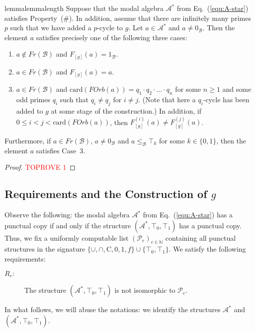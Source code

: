 \documentclass[a4paper,UKenglish,cleveref, autoref, thm-restate]{lipics-v2021}
\begin{document}
\begin{restatable}{lemma}{lemmalength}\label{lemma:length}
	Suppose that the modal algebra $\mathcal{A}^{\ast}$ from Eq.~(\ref{equ:A-star}) satisfies Property~(\#). In addition, assume that there are infinitely many primes $p$ such that we have added a $p$-cycle to $g$. Let $a \in \mathcal{A}^{\ast}$ and $a \neq 0_{\mathcal{B}}$. Then the element $a$ satisfies precisely one of the following three cases:
	\begin{enumerate}
		\item $a\not\in Fr(\mathcal{B})$ and $F_{[g]}(a) = 1_{\mathcal{B}}$.
		
		\item $a \in Fr(\mathcal{B})$ and $F_{[g]}(a) = a$.
		
		\item $a\in Fr(\mathcal{B})$ and $\mathrm{card}(FOrb(a)) = q_1\cdot q_2\cdot \ldots\cdot  q_n$ for some $n\geq 1$ and some odd primes $q_i$ such that $q_i \neq q_j$ for $i\neq j$. (Note that here a $q_i$-cycle has been added to $g$ at some stage of the construction.) In addition, if $0\leq i < j < \mathrm{card}(FOrb(a))$, then $F_{[g]}^{(i)}(a) \neq F_{[g]}^{(j)}(a)$. 
	\end{enumerate}
	Furthermore, if $a\in Fr(\mathcal{B})$, $a\neq 0_{\mathcal{B}}$ and $a \leq_{\mathcal{B}} \top_k$ for some $k\in\{ 0,1\}$, then the element $a$ satisfies Case~3.
\end{restatable}
\begin{proof}\textcolor{red}{TOPROVE 1}\end{proof}


\subsection{Requirements and the Construction of $g$}

Observe the following: the modal algebra $\mathcal{A}^{\ast}$ from Eq.~(\ref{equ:A-star}) has a punctual copy if and only if the structure $(\mathcal{A}^{\ast}, \top_0, \top_1)$ has a punctual copy. 
Thus, we fix a uniformly computable list $(\mathcal{P}_e)_{e\in\mathbb{N}}$ containing all punctual structures in the signature $\{ \cup,\cap, \mathrm{C},0,1,f\} \cup \{ \top_0,\top_1\}$. We satisfy the following requirements:
\begin{description}
	\item[$R_e:$] The structure $(\mathcal{A}^{\ast}, \top_0,\top_1)$ is not isomorphic to $\mathcal{P}_e$.
\end{description}
In what follows, we will abuse the notations: we identify the structures $\mathcal{A}^{\ast}$ and $(\mathcal{A}^{\ast},\top_0,\top_1)$.
\end{document}

